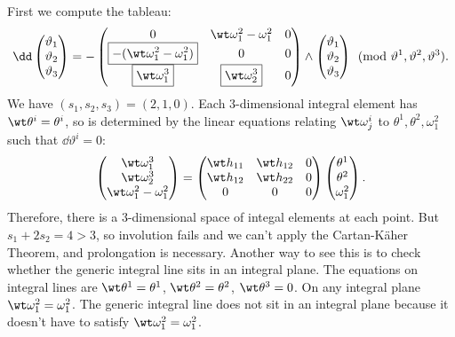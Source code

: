 \begin{example}
    First we compute the tableau:
    \[\dd \begin{pmatrix}
        \vartheta_1\\\vartheta_2\\\vartheta_3
    \end{pmatrix}
    =-\begin{pmatrix}
        0 & \wt\omega^2_1-\omega^2_1 & 0\\
        \boxed{-(\wt\omega^2_1-\omega^2_1)} & 0 & 0\\
        \boxed{\wt\omega^3_1} & \boxed{\wt\omega^3_2} & 0
    \end{pmatrix}\wedge 
    \begin{pmatrix}
        \vartheta_1\\\vartheta_2\\\vartheta_3
    \end{pmatrix} \pmod{\vartheta^1,\vartheta^2,\vartheta^3}.
    \]
    We have $(s_1,s_2,s_3)=(2,1,0)$. Each $3$-dimensional integral element has $\wt\theta^i=\theta^i$, so is determined by the linear equations relating $\wt\omega^i_j$ to $\theta^1,\theta^2,\omega^2_1$ such that $\dd\vartheta^i=0$:
    \[\begin{pmatrix}
        \wt\omega^3_1\\
        \wt\omega^3_2\\
        \wt\omega^2_1-\omega^2_1
    \end{pmatrix}=
    \begin{pmatrix}
        \wt h_{11} & \wt h_{12} & 0\\
        \wt h_{12} & \wt h_{22} & 0\\
        0 & 0 & 0
    \end{pmatrix}
    \begin{pmatrix}
        \theta^1\\\theta^2\\\omega^2_1
    \end{pmatrix}.\label{eq 12942}
    \]
    Therefore, there is a $3$-dimensional space of integal elements at each point. But $s_1+2s_2=4>3$, so involution fails and we can't apply the Cartan-K\"aher Theorem, and prolongation is necessary. Another way to see this is to check whether the generic integral line sits in an integral plane. The equations on integral lines are $\wt\theta^1=\theta^1$, $\wt\theta^2=\theta^2$, $\wt\theta^3=0$. On any integral plane $\wt\omega^2_1=\omega^2_1$. The generic integral line does not sit in an integral plane because it doesn't have to satisfy $\wt\omega^2_1=\omega^2_1$.
\end{example}

